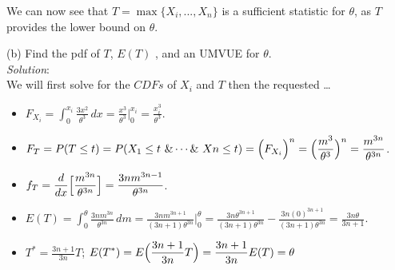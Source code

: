 \documentclass[12pt]{article}
\newcommand{\ds}{\displaystyle}
\begin{document}
\noindent
We can now see that $ \ds T = \max\{X_{i},...,X_{n}\} $ is a sufficient statistic for $ \theta $, as $ T $ provides the lower bound on $ \theta $. \\

\vspace{2.5mm}

(b) Find the pdf of $ T $, $ E(T)$ , and an UMVUE for $ \theta $.
\vspace{2.5mm} \\
\textit{Solution}:
\vspace{2.5mm} \\

\noindent
We will first solve for the $CDFs$ of $X_{i}$ and $T$ then the requested \dots 

\begin{itemize}
    \item $ \ds F_{X_{i}} = \int_{0}^{x_{i}} \frac{3x^{2}}{\theta^{3}} \,dx = \frac{x^{3}}{\theta^{3}} \Big|_{0}^{x_{i}} = \frac{x_{i}^{3}}{\theta^{3}} $.
\end{itemize}

\begin{itemize}
    \item $ \ds F_{T} = P(T \le t) = P(X_{1} \le t \ \& \cdots \& \ X{n} \le t) = \Bigl( F_{X_{i}} \Bigr)^{n} = \Bigl( \frac{m^{3}}{\theta^{3}} \Bigr)^{n} = \frac{m^{3n}}{\theta^{3n}} $.
\end{itemize}

\begin{itemize}
    \item $ \ds f_{T} = \frac{d}{dx} \Bigl[ \frac{m^{3n}}{\theta^{3n}} \Bigr] = \frac{3nm^{3n-1}}{\theta^{3n}} $.
\end{itemize}

\begin{itemize}
    \item $ \ds E(T) = \int_{0}^{\theta} \frac{3nm^{3n}}{\theta^{3n}} \, dm = \frac{3nm^{3n + 1}}{(3n + 1)\theta^{3n}} \Big|_{0}^{\theta} = \frac{3n\theta^{3n + 1}}{(3n + 1)\theta^{3n}} - \frac{3n(0)^{3n + 1}}{(3n + 1)\theta^{3n}} = \frac{3n\theta}{3n + 1} $.
\end{itemize}

\begin{itemize}
    \item $ \ds T^{*} = \frac{3n+1}{3n}T $; $ \ds E(T^{*}) = E \Bigl( \frac{3n+1}{3n}T \Bigr) = \frac{3n+1}{3n} E( T ) = \theta $
\end{itemize}
\end{document}
